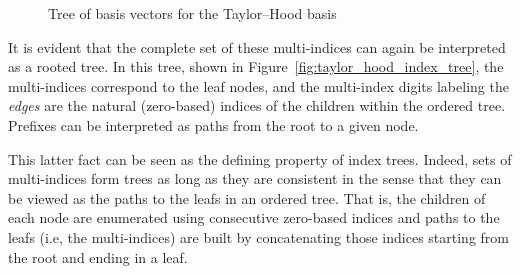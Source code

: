 \documentclass[a4paper,10pt,headings=normal,bibliography=totoc]{scrartcl}
\begin{document}
\begin{figure}
    \begin{center}
    \end{center}
    \caption{Tree of basis vectors for the Taylor--Hood basis}
    \label{fig:taylor_hood_basis_function_tree}
\end{figure}

It is evident that the complete set of these multi-indices can again be interpreted as a rooted tree.
In this tree, shown in Figure~\ref{fig:taylor_hood_index_tree}, the multi-indices correspond
to the leaf nodes, and the multi-index digits labeling the \emph{edges} are the
natural (zero-based) indices of the children within the ordered tree.  Prefixes can be
interpreted as paths from the root to a given node.

This latter fact can be seen as the defining property of index trees.  Indeed,
sets of multi-indices form trees as long as they are consistent in the sense that they
can be viewed as the paths to the leafs in an ordered tree.
That is, the children of each node are enumerated using consecutive zero-based
indices and paths to the leafs (i.e, the multi-indices) are built by concatenating
those indices starting from the root and ending in a leaf.
\end{document}
